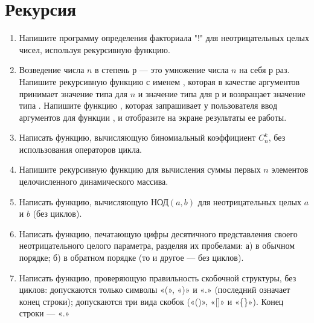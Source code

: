 \chapter{Рекурсия}
\begin{enumerate}[leftmargin=*]
    \item Напишите программу определения факториала "!" для неотрицательных целых чисел, используя рекурсивную функцию.
    \item Возведение числа $n$ в степень $р$ — это умножение числа $n$ на себя $р$ раз. Напишите рекурсивную функцию с именем , которая в качестве аргументов принимает значение типа  для $n$ и значение типа  для $р$ и возвращает значение типа . Напишите функцию , которая запрашивает у пользователя ввод аргументов для функции , и отобразите на экране результаты ее работы.
    \item Написать функцию, вычисляющую биномиальный коэффициент $C_n^k$, без использования операторов цикла.
    \item Напишите рекурсивную функцию для вычисления суммы первых $n$ элементов целочисленного динамического массива.
    \item Написать функцию, вычисляющую $\textbf{НОД}(a,b)$ для неотрицательных целых $a$ и $b$ (без циклов).
    \item Написать функцию, печатающую цифры десятичного представления своего неотрицательного целого параметра, разделяя их пробелами: а) в обычном порядке; б) в обратном порядке (то и другое — без циклов).
    \item Написать функцию, проверяющую правильность скобочной структуры, без циклов:
    допускаются только символы «(», «)» и «.» (последний означает конец строки);
    допускаются три вида скобок («()», «[]» и «\{\}»). Конец строки — «.»
\end{enumerate}